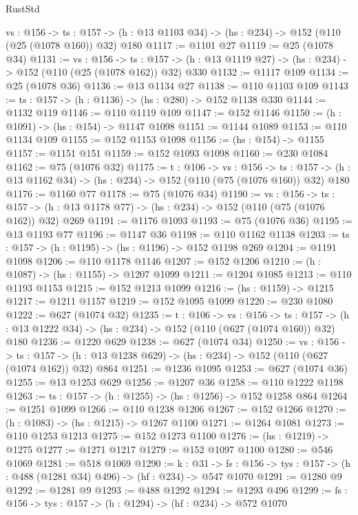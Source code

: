 \begin{lexlean}{RustStd}
\begin{coremodule}
  {vs : @156} ->
  {ts : @157} -> (h : @13 @1103 @34) -> (hs : @234) -> @152 (@110 (@25 (@1078 @160)) @32) @180
@1117 := @1101 @27
@1119 := @25 (@1078 @34)
@1131 := {vs : @156} ->
  {ts : @157} -> (h : @13 @1119 @27) -> (hs : @234) -> @152 (@110 (@25 (@1078 @162)) @32) @330
@1132 := @1117 @109
@1134 := @25 (@1078 @36)
@1136 := @13 @1134 @27
@1138 := @110 @1103 @109
@1143 := {ts : @157} -> (h : @1136) -> (hs : @280) -> @152 @1138 @330
@1144 := @1132 @119
@1146 := @110 @1119 @109
@1147 := @152 @1146
@1150 := (h : @1091) -> (hs : @154) -> @1147 @1098
@1151 := @1144 @1089
@1153 := @110 @1134 @109
@1155 := @152 @1153 @1098
@1156 := (hs : @154) -> @1155
@1157 := @1151 @151
@1159 := @152 @1093 @1098
@1160 := @230 @1084
@1162 := @75 (@1076 @32)
@1175 := {t : @106} ->
  {vs : @156} ->
  {ts : @157} -> (h : @13 @1162 @34) -> (hs : @234) -> @152 (@110 (@75 (@1076 @160)) @32) @180
@1176 := @1160 @77
@1178 := @75 (@1076 @34)
@1190 := {vs : @156} ->
  {ts : @157} -> (h : @13 @1178 @77) -> (hs : @234) -> @152 (@110 (@75 (@1076 @162)) @32) @269
@1191 := @1176 @1093
@1193 := @75 (@1076 @36)
@1195 := @13 @1193 @77
@1196 := @1147 @36
@1198 := @110 @1162 @1138
@1203 := {ts : @157} -> (h : @1195) -> (hs : @1196) -> @152 @1198 @269
@1204 := @1191 @1098
@1206 := @110 @1178 @1146
@1207 := @152 @1206
@1210 := (h : @1087) -> (hs : @1155) -> @1207 @1099
@1211 := @1204 @1085
@1213 := @110 @1193 @1153
@1215 := @152 @1213 @1099
@1216 := (hs : @1159) -> @1215
@1217 := @1211 @1157
@1219 := @152 @1095 @1099
@1220 := @230 @1080
@1222 := @627 (@1074 @32)
@1235 := {t : @106} ->
  {vs : @156} ->
  {ts : @157} -> (h : @13 @1222 @34) -> (hs : @234) -> @152 (@110 (@627 (@1074 @160)) @32) @180
@1236 := @1220 @629
@1238 := @627 (@1074 @34)
@1250 := {vs : @156} ->
  {ts : @157} -> (h : @13 @1238 @629) -> (hs : @234) -> @152 (@110 (@627 (@1074 @162)) @32) @864
@1251 := @1236 @1095
@1253 := @627 (@1074 @36)
@1255 := @13 @1253 @629
@1256 := @1207 @36
@1258 := @110 @1222 @1198
@1263 := {ts : @157} -> (h : @1255) -> (hs : @1256) -> @152 @1258 @864
@1264 := @1251 @1099
@1266 := @110 @1238 @1206
@1267 := @152 @1266
@1270 := (h : @1083) -> (hs : @1215) -> @1267 @1100
@1271 := @1264 @1081
@1273 := @110 @1253 @1213
@1275 := @152 @1273 @1100
@1276 := (hs : @1219) -> @1275
@1277 := @1271 @1217
@1279 := @152 @1097 @1100
@1280 := @546 @1069
@1281 := @518 @1069
@1290 := {k : @31} ->
  {fs : @156} -> {tys : @157} -> (h : @488 (@1281 @34) @496) -> (hf : @234) -> @547 @1070
@1291 := @1280 @9
@1292 := @1281 @9
@1293 := @488 @1292
@1294 := @1293 @496
@1299 := {fs : @156} -> {tys : @157} -> (h : @1294) -> (hf : @234) -> @572 @1070

\end{coremodule}
\end{lexlean}

